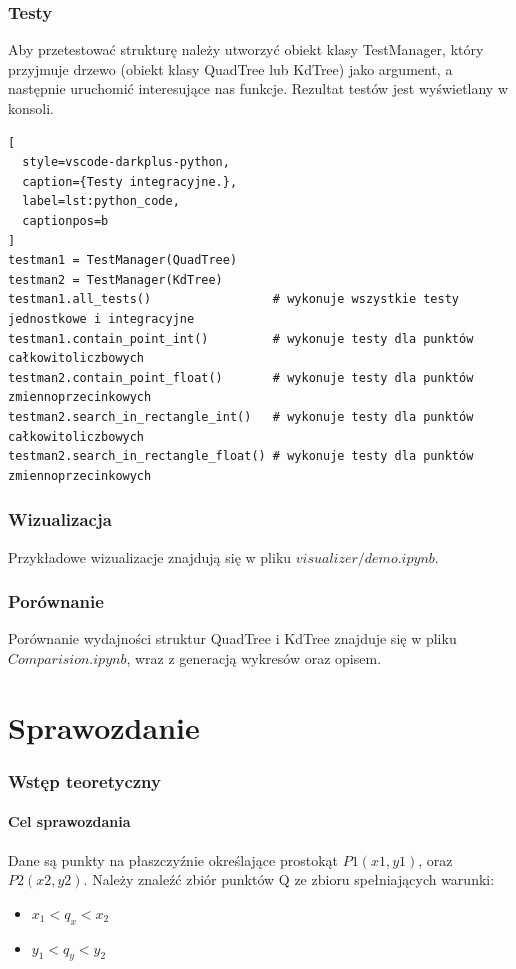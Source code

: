 \documentclass{lab}
\begin{document}
\section{Testy}
Aby przetestować strukturę należy utworzyć obiekt klasy TestManager, który przyjmuje drzewo (obiekt klasy QuadTree lub KdTree) jako argument, a następnie uruchomić interesujące nas funkcje. Rezultat testów jest wyświetlany w konsoli.
\begin{lstlisting}[
  style=vscode-darkplus-python,
  caption={Testy integracyjne.},
  label=lst:python_code,
  captionpos=b
]
testman1 = TestManager(QuadTree)
testman2 = TestManager(KdTree)
testman1.all_tests()                 # wykonuje wszystkie testy jednostkowe i integracyjne
testman1.contain_point_int()         # wykonuje testy dla punktów całkowitoliczbowych
testman2.contain_point_float()       # wykonuje testy dla punktów zmiennoprzecinkowych
testman2.search_in_rectangle_int()   # wykonuje testy dla punktów całkowitoliczbowych
testman2.search_in_rectangle_float() # wykonuje testy dla punktów zmiennoprzecinkowych
\end{lstlisting}

\section{Wizualizacja}
Przykładowe wizualizacje znajdują się w pliku $visualizer/demo.ipynb$.

\section{Porównanie}
Porównanie wydajności struktur QuadTree i KdTree znajduje się w pliku $Comparision.ipynb$, wraz z generacją wykresów oraz opisem.

\part{Sprawozdanie}
\section{Wstęp teoretyczny}
\subsection{Cel sprawozdania}
Dane są punkty na płaszczyźnie określające prostokąt $P1(x1,y1)$, oraz $P2(x2,y2)$. Należy znaleźć zbiór punktów Q ze zbioru spełniających warunki:
\begin{itemize}
    \item $x_1 < q_x < x_2$
    \item $y_1 < q_y < y_2$
\end{itemize}
\end{document}
